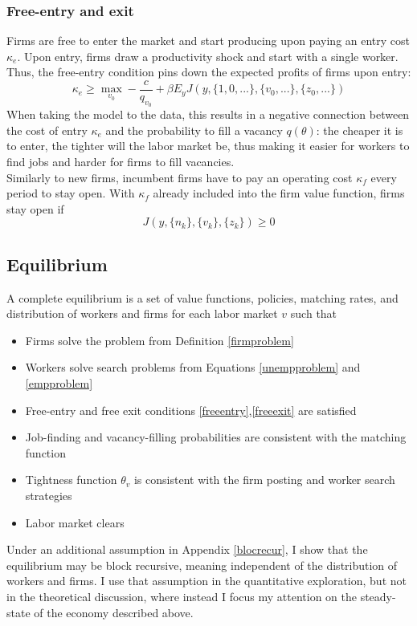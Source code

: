 \subsubsection*{Free-entry and exit}
Firms are free to enter the market and start producing upon paying an entry cost $\kappa_e$. Upon entry, firms draw a productivity shock and start with a single worker. Thus, the free-entry condition pins down the expected profits of firms upon entry:
\begin{equation} \label{freeentry}
    \kappa_e\geq \max_{v_0} -\frac{c}{q_{v_0}}+\beta E_y J(y,\{1,0,...\},\{v_0,...\},\{z_0,...\})
\end{equation}
When taking the model to the data, this results in a negative connection between the cost of entry $\kappa_e$ and the probability to fill a vacancy $q(\theta)$: the cheaper it is to enter, the tighter will the labor market be, thus making it easier for workers to find jobs and harder for firms to fill vacancies.
\\
Similarly to new firms, incumbent firms have to pay an operating cost $\kappa_f$ every period to stay open. With $\kappa_f$ already included into the firm value function, firms stay open if 
\begin{equation} \label{freeexit}
    J(y,\{n_k\},\{v_k\},\{z_k\})\geq 0
\end{equation}

\subsection{Equilibrium}
A complete equilibrium is a set of value functions, policies, matching rates, and distribution of workers and firms for each labor market $v$ such that 
\begin{itemize}
    \item Firms solve the problem from Definition \ref{firmproblem}
    \item Workers solve search problems from Equations \ref{unempproblem} and \ref{empproblem}
    \item Free-entry  and free exit conditions \ref{freeentry},\ref{freeexit}  are satisfied
    \item Job-finding and vacancy-filling probabilities are consistent with the matching function
    \item Tightness function $\theta_v$ is consistent with the firm posting and worker search strategies
    \item Labor market clears
\end{itemize}
Under an additional assumption in Appendix \ref{blocrecur}, I show that the equilibrium may be block recursive, meaning independent of the distribution of workers and firms. I use that assumption in the quantitative exploration, but not in the theoretical discussion, where instead I focus my attention on the steady-state of the economy described above.

